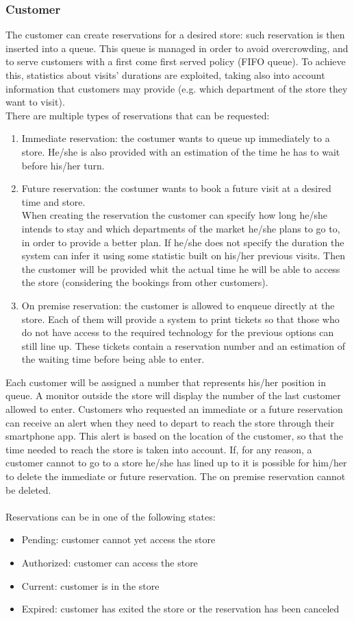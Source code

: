 \subsubsection{Customer}
The customer can create reservations for a desired store: such reservation is then inserted into a queue. This queue is managed in order to avoid overcrowding, and to serve customers with a first come first served policy (FIFO queue). To achieve this, statistics about visits' durations are exploited, taking also into account information that customers may provide (e.g. which department of the store they want to visit).\\
There are multiple types of reservations that can be requested:
\begin{enumerate}
	\item Immediate reservation: the costumer wants to queue up immediately to a store. He/she is also provided with an estimation of the time he has to wait before his/her turn.
	\item Future reservation: the costumer wants to book a future visit at a desired time and store.\\ When creating the reservation the customer can specify how long he/she intends to stay and which departments of the market he/she plans to go to, in order to provide a better plan. If he/she does not specify the duration the system can infer it using some statistic built on his/her previous visits. Then the customer will be provided whit the actual time he will be able to access the store (considering the bookings from other customers).
	\item On premise reservation: the customer is allowed to enqueue directly at the store. Each of them will provide a system to print tickets so that those who do not have access to the required technology for the previous options can still line up. These tickets contain a reservation number and an estimation of the waiting time before being able to enter.
\end{enumerate}
Each customer will be assigned a number that represents his/her position in queue. A monitor outside the store will display the number of the last customer allowed to enter.
Customers who requested an immediate or a future reservation can receive an alert when they need to depart to reach the store through their smartphone app.
This alert is based on the location of the customer, so that the time needed to reach the store is taken into account. If, for any reason, a customer cannot to go to a store he/she has lined up to it is possible for him/her to delete the immediate or future reservation. The on premise reservation cannot be deleted.\\\\
Reservations can be in one of the following states:
\begin{itemize}
	\item Pending: customer cannot yet access the store
	\item Authorized: customer can access the store
	\item Current: customer is in the store
	\item Expired: customer has exited the store or the reservation has been canceled
\end{itemize} 
